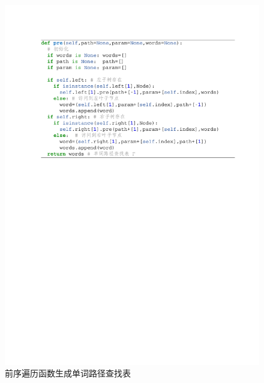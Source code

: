 \begin{figure}[!ht]
  \centering
\includegraphics[width=1\linewidth]{./figures/preorder.pdf}
\caption{前序遍历函数生成单词路径查找表}\label{code:preorder}
\end{figure}

